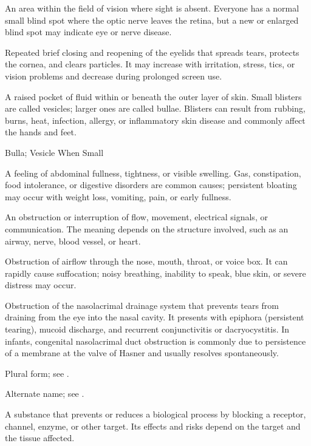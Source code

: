  An area within the field of vision where sight is absent. Everyone has a normal small blind spot where the optic nerve leaves the retina, but a new or enlarged blind spot may indicate eye or nerve disease.

 Repeated brief closing and reopening of the eyelids that spreads tears, protects the cornea, and clears particles. It may increase with irritation, stress, tics, or vision problems and decrease during prolonged screen use.

 A raised pocket of fluid within or beneath the outer layer of skin. Small blisters are called vesicles; larger ones are called bullae. Blisters can result from rubbing, burns, heat, infection, allergy, or inflammatory skin disease and commonly affect the hands and feet.


\synonyms
Bulla; Vesicle When Small

 A feeling of abdominal fullness, tightness, or visible swelling. Gas, constipation, food intolerance, or digestive disorders are common causes; persistent bloating may occur with weight loss, vomiting, pain, or early fullness.

 An obstruction or interruption of flow, movement, electrical signals, or communication. The meaning depends on the structure involved, such as an airway, nerve, blood vessel, or heart.

 Obstruction of airflow through the nose, mouth, throat, or voice box. It can rapidly cause suffocation; noisy breathing, inability to speak, blue skin, or severe distress may occur.

 Obstruction of the nasolacrimal drainage system that prevents tears from draining from the eye into the nasal cavity. It presents with epiphora (persistent tearing), mucoid discharge, and recurrent conjunctivitis or dacryocystitis. In infants, congenital nasolacrimal duct obstruction is commonly due to persistence of a membrane at the valve of Hasner and usually resolves spontaneously.

 Plural form; see .

 Alternate name; see .

 A substance that prevents or reduces a biological process by blocking a receptor, channel, enzyme, or other target. Its effects and risks depend on the target and the tissue affected.


